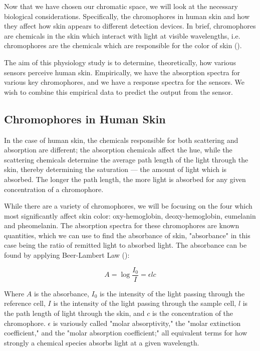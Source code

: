 Now that we have chosen our chromatic space, we will look at the necessary biological considerations. Specifically, the chromophores in human skin and how they affect how skin appears to different detection devices. In brief, chromophores are chemicals in the skin which interact with light at visible wavelengths, i.e. chromophores are the chemicals which are responsible for the color of skin (\cite{Anderson1981}).

The aim of this physiology study is to determine, theoretically, how various sensors perceive human skin. Empirically, we have the absorption spectra for various key chromophores, and we have a response spectra for the sensors. We wish to combine this empirical data to predict the output from the sensor. 

\subsection{Chromophores in Human Skin}

In the case of human skin, the chemicals responsible for both scattering and absorption are different; the absorption chemicals affect the hue, while the scattering chemicals determine the average path length of the light through the skin, thereby determining the saturation --- the amount of light which is absorbed. The longer the path length, the more light is absorbed for any given concentration of a chromophore. 

While there are a variety of chromophores, we will be focusing on the four which most significantly affect skin color: oxy-hemoglobin, deoxy-hemoglobin, eumelanin and pheomelanin. The absorption spectra for these chromophores are known quantities, which we can use to find the absorbance of skin, "absorbance" in this case being the ratio of remitted light to absorbed light. The absorbance can be found by applying Beer-Lambert Law (\cite{Clark2007}):

\begin{equation}\label{eq:BeerLambert}
A = \log \frac{I_{0}}{I} = \epsilon l  c 
\end{equation}

Where $A$ is the absorbance, $I_{0}$ is the intensity of the light passing through the reference cell, $I$ is the intensity of the light passing through the sample cell, $l$ is the path length of light through the skin, and $c$ is the concentration of the chromophore. $\epsilon$ is variously called "molar absorptivity," the "molar extinction coefficient," and the "molar absorption coefficient;" all equivalent terms for how strongly a chemical species absorbs light at a given wavelength.

